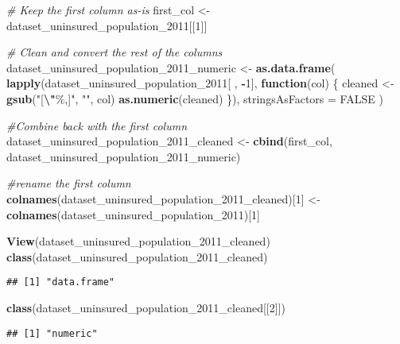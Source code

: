 \documentclass[
]{article}
\newenvironment{Shaded}{\begin{snugshade}}{\end{snugshade}}
\newcommand{\AttributeTok}[1]{\textcolor[rgb]{0.13,0.29,0.53}{#1}}
\newcommand{\CommentTok}[1]{\textcolor[rgb]{0.56,0.35,0.01}{\textit{#1}}}
\newcommand{\ConstantTok}[1]{\textcolor[rgb]{0.56,0.35,0.01}{#1}}
\newcommand{\ControlFlowTok}[1]{\textcolor[rgb]{0.13,0.29,0.53}{\textbf{#1}}}
\newcommand{\DecValTok}[1]{\textcolor[rgb]{0.00,0.00,0.81}{#1}}
\newcommand{\FunctionTok}[1]{\textcolor[rgb]{0.13,0.29,0.53}{\textbf{#1}}}
\newcommand{\NormalTok}[1]{#1}
\newcommand{\OtherTok}[1]{\textcolor[rgb]{0.56,0.35,0.01}{#1}}
\newcommand{\SpecialCharTok}[1]{\textcolor[rgb]{0.81,0.36,0.00}{\textbf{#1}}}
\newcommand{\StringTok}[1]{\textcolor[rgb]{0.31,0.60,0.02}{#1}}
\begin{document}
\begin{Shaded}
\begin{Highlighting}[]
\CommentTok{\# Keep the first column as{-}is}
\NormalTok{first\_col }\OtherTok{\textless{}{-}}\NormalTok{ dataset\_uninsured\_population\_2011[[}\DecValTok{1}\NormalTok{]]}

\CommentTok{\# Clean and convert the rest of the columns}
\NormalTok{dataset\_uninsured\_population\_2011\_numeric }\OtherTok{\textless{}{-}} \FunctionTok{as.data.frame}\NormalTok{(}
  \FunctionTok{lapply}\NormalTok{(dataset\_uninsured\_population\_2011[ , }\SpecialCharTok{{-}}\DecValTok{1}\NormalTok{], }\ControlFlowTok{function}\NormalTok{(col) \{}
\NormalTok{    cleaned }\OtherTok{\textless{}{-}} \FunctionTok{gsub}\NormalTok{(}\StringTok{"[}\SpecialCharTok{\textbackslash{}"}\StringTok{\%,]"}\NormalTok{, }\StringTok{""}\NormalTok{, col)}
    \FunctionTok{as.numeric}\NormalTok{(cleaned)}
\NormalTok{  \}),}
  \AttributeTok{stringsAsFactors =} \ConstantTok{FALSE}
\NormalTok{)}

\CommentTok{\#Combine back with the first column}
\NormalTok{dataset\_uninsured\_population\_2011\_cleaned }\OtherTok{\textless{}{-}} \FunctionTok{cbind}\NormalTok{(first\_col, dataset\_uninsured\_population\_2011\_numeric)}

\CommentTok{\#rename the first column}
\FunctionTok{colnames}\NormalTok{(dataset\_uninsured\_population\_2011\_cleaned)[}\DecValTok{1}\NormalTok{] }\OtherTok{\textless{}{-}} \FunctionTok{colnames}\NormalTok{(dataset\_uninsured\_population\_2011)[}\DecValTok{1}\NormalTok{]}

\FunctionTok{View}\NormalTok{(dataset\_uninsured\_population\_2011\_cleaned)}
\FunctionTok{class}\NormalTok{(dataset\_uninsured\_population\_2011\_cleaned)}
\end{Highlighting}
\end{Shaded}

\begin{verbatim}
## [1] "data.frame"
\end{verbatim}

\begin{Shaded}
\begin{Highlighting}[]
\FunctionTok{class}\NormalTok{(dataset\_uninsured\_population\_2011\_cleaned[[}\DecValTok{2}\NormalTok{]])}
\end{Highlighting}
\end{Shaded}

\begin{verbatim}
## [1] "numeric"
\end{verbatim}
\end{document}
